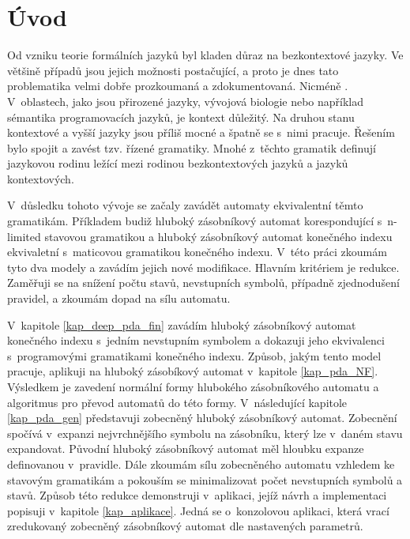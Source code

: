 
\chapter{Úvod}

Od vzniku teorie formálních jazyků byl kladen důraz na bezkontextové jazyky. Ve většině případů jsou jejich možnosti postačující, a proto je dnes tato problematika velmi dobře prozkoumaná a zdokumentovaná. Nicméně  \cite{Dassow:RegulatedRewriting}. V~oblastech, jako jsou přirozené jazyky, vývojová biologie nebo například sémantika programovacích jazyků, je kontext důležitý. Na druhou stanu kontextové a vyšší jazyky jsou příliš mocné a špatně se s~nimi pracuje. Řešením bylo spojit  \cite{Dassow:RegulatedRewriting} a zavést tzv. řízené gramatiky. Mnohé z~těchto gramatik definují jazykovou rodinu ležící mezi rodinou bezkontextových jazyků a jazyků kontextových.

V~důsledku tohoto vývoje se začaly zavádět automaty ekvivalentní těmto gramatikám. Příkladem budiž hluboký zásobníkový automat \cite{Meduna:DeepPDA} korespondující s~n-limited stavovou gramatikou a hluboký zásobníkový automat konečného indexu \cite{Meduna:FinitelyDeepPDA} ekvivaletní s~maticovou gramatikou konečného indexu. V~této práci zkoumám tyto dva modely a zavádím jejich nové modifikace. Hlavním kritériem je redukce. Zaměřuji se na snížení počtu stavů, nevstupních symbolů, případně zjednodušení pravidel, a zkoumám dopad na sílu automatu.


V~kapitole \ref{kap_deep_pda_fin} zavádím hluboký zásobníkový automat konečného indexu s~jedním nevstupním symbolem a dokazuji jeho ekvivalenci s~programovými gramatikami konečného indexu. Způsob, jakým tento model pracuje, aplikuji na hluboký zásobíkový automat v~kapitole \ref{kap_pda_NF}. Výsledkem je zavedení normální formy hlubokého zásobníkového automatu a algoritmus pro převod automatů do této formy. V~následující kapitole \ref{kap_pda_gen} představuji zobecněný hluboký zásobníkový automat. Zobecnění spočívá v~expanzi nejvrchnějšího symbolu na zásobníku, který lze v~daném stavu expandovat. Původní hluboký zásobníkový automat měl hloubku expanze definovanou v~pravidle. Dále zkoumám sílu zobecněného automatu vzhledem ke stavovým gramatikám a pokouším se minimalizovat počet nevstupních symbolů a stavů. Způsob této redukce demonstruji v~aplikaci, jejíž návrh a implementaci popisuji v~kapitole \ref{kap_aplikace}. Jedná se o~konzolovou aplikaci, která vrací zredukovaný zobecněný zásobníkový automat dle nastavených parametrů.



